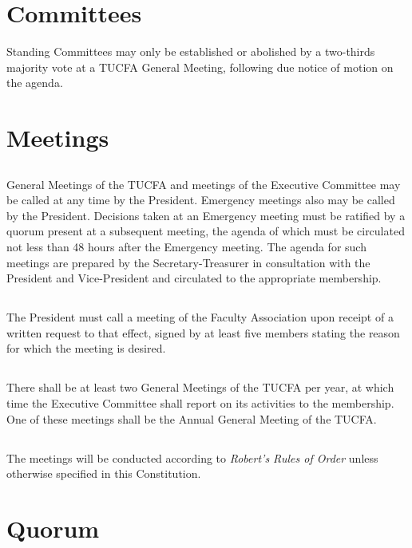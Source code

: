 \documentclass[12pt]{article}
\begin{document}
\section{Committees}

Standing Committees may only be established or abolished by a two-thirds majority vote at a TUCFA General Meeting, following due notice of motion on the agenda.

\section{Meetings}

\subsection{}
General Meetings of the TUCFA and meetings of the Executive Committee may be called at any time by the President. Emergency meetings also may be called by the President. Decisions taken at an Emergency meeting must be ratified by a quorum present at a subsequent meeting, the agenda of which must be circulated not less than 48 hours after the Emergency meeting. The agenda for such meetings are prepared by the Secretary-Treasurer in consultation with the President and Vice-President and circulated to the appropriate membership.

\subsection{}
The President must call a meeting of the Faculty Association upon receipt of a written request to that effect, signed by at least five members stating the reason for which the meeting is desired.

\subsection{}
There shall be at least two General Meetings of the TUCFA per year, at which time the Executive Committee shall report on its activities to the membership. One of these meetings shall be the Annual General Meeting of the TUCFA.

\subsection{}
The meetings will be conducted according to \emph{Robert's Rules of Order} unless otherwise specified in this Constitution.

\section{Quorum}
\end{document}
